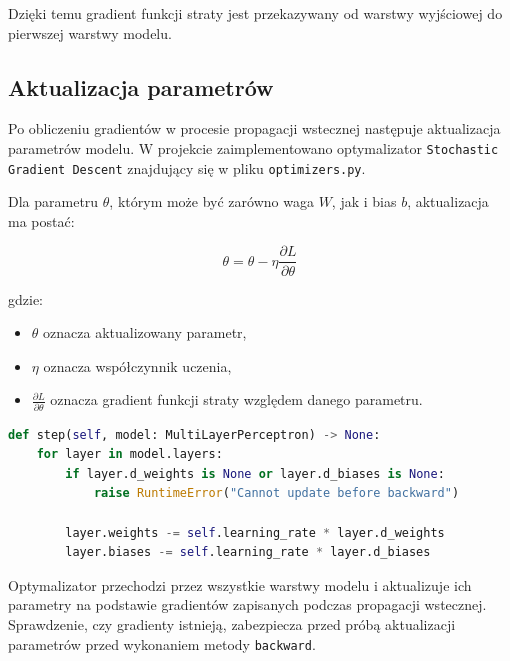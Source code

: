 Dzięki temu gradient funkcji straty jest przekazywany od warstwy wyjściowej
do pierwszej warstwy modelu.

\subsection{Aktualizacja parametrów}

Po obliczeniu gradientów w procesie propagacji wstecznej następuje
aktualizacja parametrów modelu. W projekcie zaimplementowano optymalizator
\texttt{Stochastic Gradient Descent} znajdujący się w pliku
\texttt{optimizers.py}.

\noindent 
Dla parametru \(\theta\), którym może być zarówno waga \(W\), jak i bias
\(b\), aktualizacja ma postać:

\[
    \theta =
    \theta - \eta \frac{\partial L}{\partial \theta}
\]

\noindent 
gdzie:
\begin{itemize}
    \item \(\theta\) oznacza aktualizowany parametr,
    \item \(\eta\) oznacza współczynnik uczenia,
    \item \(\frac{\partial L}{\partial \theta}\) oznacza gradient funkcji
    straty względem danego parametru.
\end{itemize}

\break

\begin{lstlisting}[language=Python, caption={Fragment kodu pokazujący definicje aktualizacji parametrów dla całej sieci.}, label={lst:backward}, basicstyle=\ttfamily\small, breaklines=true, frame=single]
def step(self, model: MultiLayerPerceptron) -> None:
    for layer in model.layers:
        if layer.d_weights is None or layer.d_biases is None:
            raise RuntimeError("Cannot update before backward")

        layer.weights -= self.learning_rate * layer.d_weights
        layer.biases -= self.learning_rate * layer.d_biases
\end{lstlisting}

Optymalizator przechodzi przez wszystkie warstwy modelu i aktualizuje ich
parametry na podstawie gradientów zapisanych podczas propagacji wstecznej.
Sprawdzenie, czy gradienty istnieją, zabezpiecza przed próbą aktualizacji
parametrów przed wykonaniem metody \texttt{backward}.
